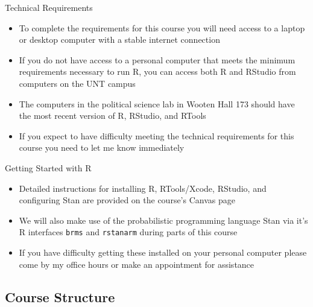 \documentclass[12pt,ignorenonframetext,aspectratio=169]{beamer}
\begin{document}
\begin{frame}{Technical Requirements}
\protect\hypertarget{technical-requirements}{}
\begin{itemize}[<+->]
\item
  To complete the requirements for this course you will need access to a
  laptop or desktop computer with a stable internet connection
\item
  If you do not have access to a personal computer that meets the
  minimum requirements necessary to run R, you can access both R and
  RStudio from computers on the UNT campus
\item
  The computers in the political science lab in Wooten Hall 173 should
  have the most recent version of R, RStudio, and RTools
\item
  If you expect to have difficulty meeting the technical requirements
  for this course you need to let me know immediately
\end{itemize}
\end{frame}

\begin{frame}[fragile]{Getting Started with R}
\protect\hypertarget{getting-started-with-r}{}
\begin{itemize}[<+->]
\item
  Detailed instructions for installing R, RTools/Xcode, RStudio, and
  configuring Stan are provided on the course's Canvas page
\item
  We will also make use of the probabilistic programming language Stan
  via it's R interfaces \texttt{brms} and \texttt{rstanarm} during parts
  of this course
\item
  If you have difficulty getting these installed on your personal
  computer please come by my office hours or make an appointment for
  assistance
\end{itemize}
\end{frame}

\hypertarget{course-structure}{%
\subsection{Course Structure}\label{course-structure}}
\end{document}
